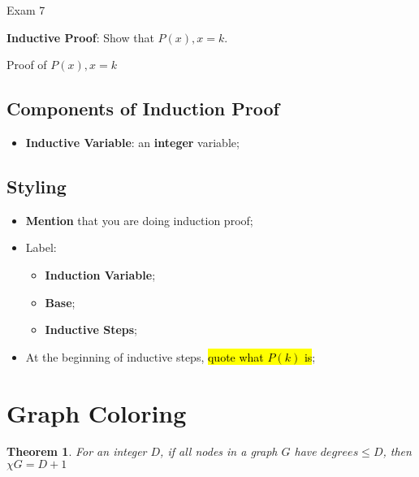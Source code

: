 \documentclass{note}
\newtheorem{theorem}{Theorem}
\begin{document}
\begin{note}{Exam 7}
\begin{tcolorbox}
		\textbf{Inductive Proof}: Show that $ P(x), x = k $.

		\begin{center}
			Proof of $ P(x), x = k $
		\end{center}
	\end{tcolorbox}

	\subsection{Components of Induction Proof}

	\begin{itemize}
		\item \textbf{Inductive Variable}: an \textbf{integer} variable;
	\end{itemize}

	\subsection{Styling}

	\begin{itemize}
	    \item \textbf{Mention} that you are doing induction proof;
	    \item Label:
		\begin{itemize}
		    \item \textbf{Induction Variable};
		    \item \textbf{Base};
		    \item \textbf{Inductive Steps};
		\end{itemize}

	    \item At the beginning of inductive steps, \hl{quote what $ P(k) $ is};
	\end{itemize}

	\section{Graph Coloring}

	\begin{theorem}
	    For an integer $ D $, if all nodes in a graph $ G $ have $ degrees \leq D $, then $ \chi G = D + 1 $
	\end{theorem}


    \end{note}
\end{document}
